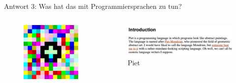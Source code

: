             \begin{frame}{Antwort 3: Was hat das mit Programmiersprachen zu tun?}
                \begin{columns}
                    \begin{column}{0.4\linewidth}
                       \begin{figure}
                    \centering
                    \includegraphics[width=\linewidth,height=0.5\textheight,keepaspectratio]{chapters/04_programming_languages/figures/hello_world_piet.jpg}
                    \caption{\cite{fig:hello_world_piet}}
                \end{figure}
                    \end{column}
                    \begin{column}{0.6\linewidth}
                        \begin{figure}
                            \centering
                            \includegraphics[width=\linewidth,height=0.5\textheight,keepaspectratio]{chapters/04_programming_languages/figures/piet.png}
                            \caption{Piet \cite{piet}}
                        \end{figure}
                    \end{column}
                \end{columns}
                

\end{frame}
